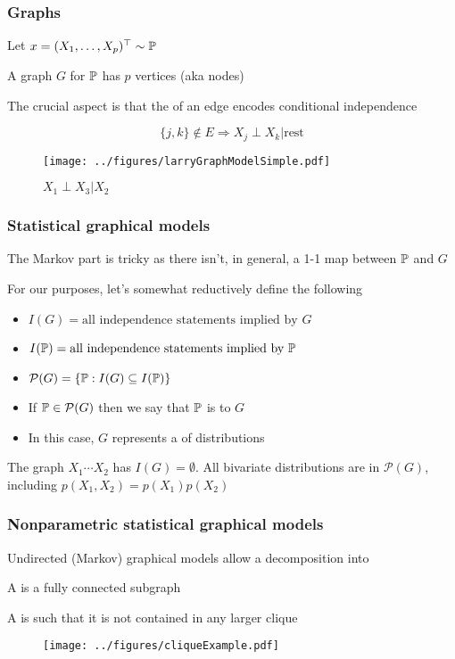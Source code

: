 \documentclass[12pt]{beamer}
\begin{document}
\begin{frame}[fragile]
\frametitle{Graphs}
Let $x = (X_1,\ldots,X_p)^{\top} \sim \P$ 

\vsp
A graph $G$ for $\P$ has $p$ vertices (aka nodes)


\vsp
The crucial aspect is that the  of an edge encodes conditional independence

\[
\{j,k\} \notin E \Rightarrow X_j \perp X_k | \textrm{rest}
\]
\vsp

\begin{figure}
\centering
\texttt{[image: ../figures/larryGraphModelSimple.pdf]}
\caption*{$X_1 \perp X_3 | X_2$}
\end{figure}

\end{frame}

\begin{frame}[fragile]
\frametitle{Statistical graphical models}
The Markov part is tricky as there isn't, in general, a 1-1 map between $\P$ and $G$ 

\vsp
For our purposes, let's somewhat reductively define the following
\begin{itemize}
\item $I(G) = \textrm{all independence statements implied by } G$
\item $I(\P) = \textrm{all independence statements implied by } \P$
\item $\mathcal{P}(G) = \{ \P: I(G) \subseteq I(\P)\}$
\item If $\P \in \mathcal{P}(G)$ then we say that $\P$ is  to $G$
\item In this case, $G$ represents a  of distributions
\end{itemize}

 The graph $X_1 \cdots X_2$ has $I(G) = \emptyset$.   All bivariate
distributions  are in $\mathcal{P}(G)$, including $p(X_1,X_2) = p(X_1)p(X_2)$
\end{frame}

\begin{frame}[fragile]
\frametitle{Nonparametric statistical graphical models}
Undirected (Markov) graphical models allow a decomposition into 

\vsp
A  is a fully connected subgraph

\vsp
A  is such that it is not contained in any larger clique

\begin{figure}
\centering
\texttt{[image: ../figures/cliqueExample.pdf]}
\end{figure}

\end{frame}
\end{document}
